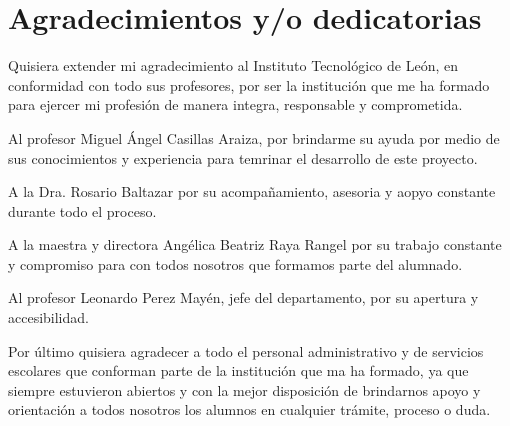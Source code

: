 \chapter{Agradecimientos y/o dedicatorias}\label{ch:agradecimientos}

Quisiera extender mi agradecimiento al Instituto Tecnol\'ogico de Le\'on, en conformidad con todo sus profesores, por ser la instituci\'on que me ha formado para ejercer mi profesi\'on de manera integra, responsable y comprometida.

\hspace{1cm}Al profesor Miguel \'Angel Casillas Araiza, por brindarme su ayuda por medio de sus conocimientos y experiencia para temrinar el desarrollo de este proyecto.

\hspace{1cm}A la Dra. Rosario Baltazar por su acompa\~namiento, asesoria y aopyo constante durante todo el proceso. 

\hspace{1cm}A la maestra y directora Ang\'elica Beatriz Raya Rangel por su trabajo constante y compromiso para con todos nosotros que formamos parte del alumnado. 

\hspace{1cm}Al profesor Leonardo Perez May\'en, jefe del departamento, por su apertura y accesibilidad.

\hspace{1cm}Por \'ultimo quisiera agradecer a todo el personal administrativo y de servicios escolares que conforman parte de la instituci\'on que ma ha formado, ya que siempre estuvieron abiertos y con la mejor disposici\'on de brindarnos apoyo y orientaci\'on a todos nosotros los alumnos en cualquier tr\'amite, proceso o duda.
